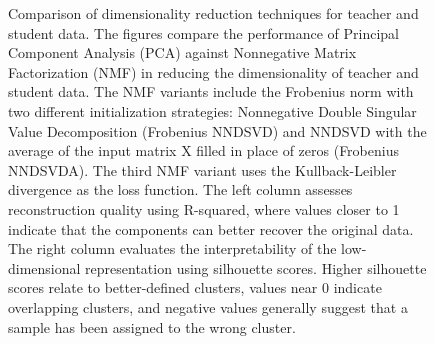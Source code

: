 \documentclass[
  number,
  preprint,
  3p,
  onecolumn]{elsarticle}
\begin{document}
\begin{figure}

\begin{minipage}{\linewidth}



\end{minipage}%
\newline
\begin{minipage}{\linewidth}



\end{minipage}%

\caption{\label{fig-nmf-pca-comparison}Comparison of dimensionality
reduction techniques for teacher and student data. The figures compare
the performance of Principal Component Analysis (PCA) against
Nonnegative Matrix Factorization (NMF) in reducing the dimensionality of
teacher and student data. The NMF variants include the Frobenius norm
with two different initialization strategies: Nonnegative Double
Singular Value Decomposition (Frobenius NNDSVD) and NNDSVD with the
average of the input matrix X filled in place of zeros (Frobenius
NNDSVDA). The third NMF variant uses the Kullback-Leibler divergence as
the loss function. The left column assesses reconstruction quality using
R-squared, where values closer to 1 indicate that the components can
better recover the original data. The right column evaluates the
interpretability of the low-dimensional representation using silhouette
scores. Higher silhouette scores relate to better-defined clusters,
values near 0 indicate overlapping clusters, and negative values
generally suggest that a sample has been assigned to the wrong cluster.}

\end{figure}%

\newpage{}

\newpage{}
\end{document}
